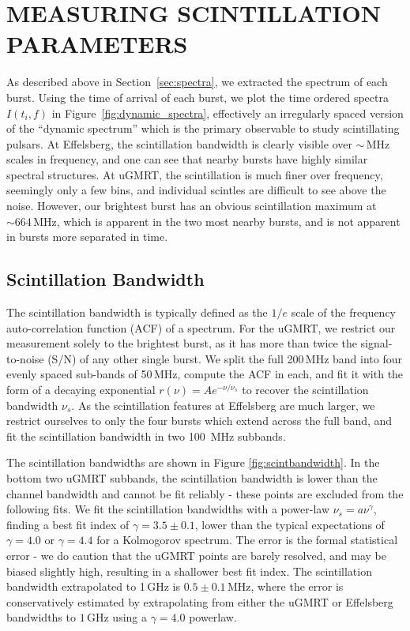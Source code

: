 \documentclass[fleqn,usenatbib]{mnras}
\begin{document}
\section{MEASURING SCINTILLATION PARAMETERS}
\label{sec:scintillation}

As described above in Section~\ref{sec:spectra}, we extracted the spectrum of each burst. Using the time of arrival of each burst, we plot the time ordered spectra $I(t_{i}, f)$ in Figure~\ref{fig:dynamic_spectra}, effectively an irregularly spaced version of the ``dynamic spectrum'' which is the primary observable to study scintillating pulsars.  At Effelsberg, the scintillation bandwidth is clearly visible over $\sim$\,MHz scales in frequency, and one can see that nearby bursts have highly similar spectral structures.  At uGMRT, the scintillation is much finer over frequency, seemingly only a few bins, and individual scintles are difficult to see above the noise.  However, our brightest burst has an obvious scintillation maximum at $\sim 664\,$MHz, which is apparent in the two most nearby bursts, and is not apparent in bursts more separated in time.

\subsection{Scintillation Bandwidth}
\label{sec:scint_bandwidth}

The scintillation bandwidth is typically defined as the $1/e$ scale of the frequency auto-correlation function (ACF) of a spectrum.  For the uGMRT, we restrict our measurement solely to the brightest burst, as it has more than twice the signal-to-noise (S/N) of any other single burst.  We split the full 200\,MHz band into four evenly spaced sub-bands of 50\,MHz, compute the ACF in each, and fit it with the form of a decaying exponential $r(\nu) = A e^{-\nu / \nu_{s}}$ to recover the scintillation bandwidth $\nu_{s}$.  As the scintillation features at Effelsberg are much larger, we restrict ourselves to only the four bursts which extend across the full band, and fit the scintillation bandwidth in two 100\, MHz subbands.  

The scintillation bandwidths are shown in Figure \ref{fig:scintbandwidth}.  In the bottom two uGMRT subbands, the scintillation bandwidth is lower than the channel bandwidth and cannot be fit reliably  - these points are excluded from the following fits.  We fit the scintillation bandwidths with a power-law $\nu_{s} = a \nu^{\gamma}$, finding a best fit index of $\gamma = 3.5 \pm 0.1$, lower than the typical expectations of $\gamma=4.0$ %
or $\gamma=4.4$ for a Kolmogorov spectrum. The error is the formal statistical error -
we do caution that the uGMRT points are barely resolved, and may be biased slightly high, resulting in a shallower best fit index. 
The scintillation bandwidth extrapolated to 1\,GHz is $0.5\pm0.1$\,MHz, where the error is conservatively estimated by extrapolating from either the uGMRT or Effelsberg bandwidths to $1\,$GHz using  a $\gamma=4.0$ powerlaw.
\end{document}
